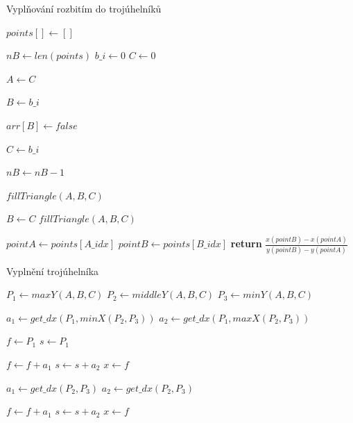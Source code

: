 \documentclass[a4paper,12pt]{report}
\begin{document}
\begin{multicols}{2}

\begin{algorithm}[H]
\caption{Vyplňování rozbitím do trojúhelníků}
\begin{algorithmic}

\State $points[] \gets []$

\State $nB \gets len(points)$
\State $b\_i \gets 0$
\State $C \gets 0$


\State $A \gets C$

\EndWhile

\State $B \gets b\_i$

\State $arr[B] \gets false$

\EndWhile

\State $C \gets b\_i$

\State $nB \gets nB-1$

\State $fillTriangle(A,B,C)$

\EndWhile

\State $B \gets C$
\EndWhile
\State $fillTriangle(A,B,C)$
\EndFunction

    \State $pointA \gets points[A\_idx]$
    \State $pointB \gets points[B\_idx]$
    \State \textbf{return} $\frac{x(pointB)-x(pointA)}{y(pointB)-y(pointA)}$
\EndFunction

\end{algorithmic}
\end{algorithm}


\begin{algorithm}[H]
\begin{algorithmic}

\ContinuedFloat
\caption{Vyplnění trojúhelníka}
\State $P_1 \gets maxY(A,B,C)$
\State $P_2 \gets middleY(A,B,C)$
\State $P_3 \gets minY(A,B,C)$

\State $a_1 \gets get\_dx(P_1,minX(P_2,P_3))$
\State $a_2 \gets get\_dx(P_1,maxX(P_2,P_3))$

\State $f \gets P_1$
\State $s \gets P_1$


	\State $f \gets f+a_1$
	\State $s \gets s+a_2$
	\State $x \gets f$
	\\
	\EndWhile	
\EndFor


\State $a_1 \gets get\_dx(P_2,P_3)$
\Else
\State $a_2 \gets get\_dx(P_2,P_3)$
\EndIf

	\State $f \gets f+a_1$
	\State $s \gets s+a_2$
	\State $x \gets f$
	\\
	\EndWhile	
\EndFor	
\EndFunction
\end{algorithmic}
\end{algorithm}
\end{multicols}
\end{document}
